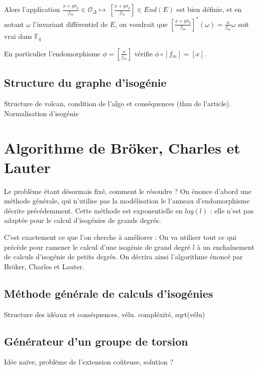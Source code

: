 \documentclass{article}
\newcommand{\OR}[0]{\mathcal{O}}
\newcommand{\F}[0]{\mathbb{F}}
\begin{document}
Alors l'application $\frac{x + y\pi_{q}}{f_{m}} \in \OR_{\Delta}\mapsto\ \left[ \frac{x + y\pi_{q}}{f_{m}}\right] \in End(E) $ est bien définie, et en notant $\omega$ l'invariant différentiel de $E$, on voudrait que
$\left[ \frac{x + y\pi_{q}}{f_{m}}\right] ^{*} (\omega) = \frac{x}{f_{m}}\omega$ soit vrai dans $\F_{q}$

En particulier l'endomorphisme $\phi = \left[ \frac{x}{f_{m}}\right] $ vérifie $\phi\circ\left[ f_{m}\right] =\left[ x\right] $.


\subsection{Structure du graphe d'isogénie}

Structure de volcan, condition de l'algo et conséquences (thm de l'article). Normalisation d'isogénie
















\section{Algorithme de Bröker, Charles et Lauter}

Le problème étant désormais fixé, comment le résoudre ? On énonce d'abord une méthode générale, qui n'utilise pas la modélisation le l'anneau d’endomorphisme décrite précédemment. Cette méthode est exponentielle en $log(l)$ : elle n'est pas adaptée pour le calcul d'isogénies de grands degrés.

C'est exactement ce que l'on cherche à améliorer : On va utiliser tout ce qui précède pour ramener le calcul d'une isogénie de grand degré $l$ à un enchaînement de calculs d'isogénie de petits degrés. On décrira ainsi l’algorithme énoncé par Bröker, Charles et Lauter. 

\subsection{Méthode générale de calculs d'isogénies}
Structure des idéaux et conséquences, vélu. compléxité, sqrt(vélu)

\subsection{Générateur d'un groupe de torsion}
Idée naïve, problème de l'extension coûteuse, solution ?
\end{document}
